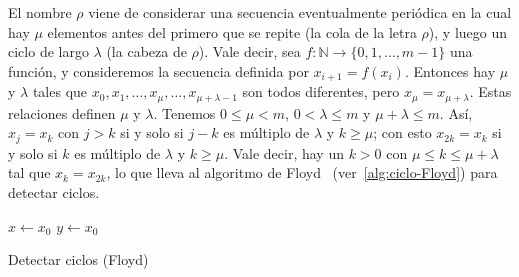   El nombre \(\rho\)
  viene de considerar una secuencia eventualmente periódica
  en la cual hay \(\mu\) elementos antes del primero que se repite
  (la cola de la letra \(\rho\)),
  y luego un ciclo de largo \(\lambda\)
  (la cabeza de \(\rho\)).
  Vale decir,
  sea \(f \colon \mathbb{N} \rightarrow \{0, 1, \dotsc, m - 1\}\)
  una función,
  y consideremos la secuencia definida por \(x_{i + 1} = f(x_i)\).
  Entonces hay \(\mu\) y \(\lambda\)
  tales que
    \(x_0, x_1, \dotsc, x_\mu, \dotsc, x_{\mu + \lambda - 1}\)
  son todos diferentes,
  pero \(x_\mu = x_{\mu + \lambda}\).
  Estas relaciones definen \(\mu\) y \(\lambda\).
  Tenemos \(0 \le \mu < m\),
  \(0 < \lambda \le m\) y \(\mu + \lambda \le m\).
  Así,
  \(x_j = x_k\) con \(j > k\)
  si y solo si \(j - k\) es múltiplo de \(\lambda\)
  y \(k \ge \mu\);
  con esto \(x_{2 k} = x_k\)
  si y solo si \(k\) es múltiplo de \(\lambda\)
  y \(k \ge \mu\).
  Vale decir,
  hay un \(k > 0\) con \(\mu \le k \le \mu + \lambda\)
  tal que \(x_k = x_{2 k}\),
  lo que lleva al algoritmo de Floyd~%
    \cite{floyd67:_non_deter_algor}%
  (ver~\ref{alg:ciclo-Floyd})
  para detectar ciclos.
  \begin{algorithm}[htbp]
    \(x \leftarrow x_0\) \;
    \(y \leftarrow x_0\) \;
    \caption{Detectar ciclos (Floyd)}
    \label{alg:ciclo-Floyd}
  \end{algorithm}

